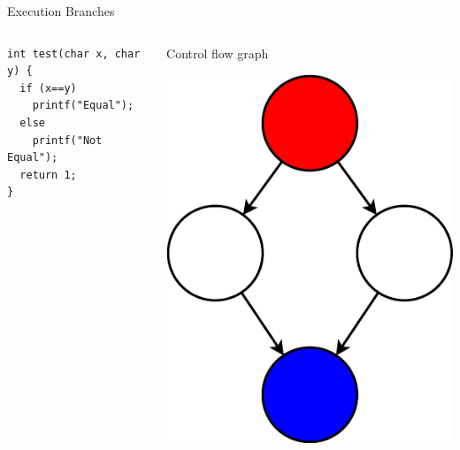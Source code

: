 \documentclass{beamer}
\begin{document}
\begin{frame}[fragile]{Execution Branches}
  \begin{columns}
    \begin{column}{0.5\textwidth}
      \begin{verbatim}
int test(char x, char y) {
  if (x==y)
    printf("Equal");
  else
    printf("Not Equal");
  return 1;
}
      \end{verbatim}
    \end{column}
    \begin{column}{0.5\textwidth}
      Control flow graph

      \includegraphics[height=0.6\textheight]{Control_flow_graph}
    \end{column}
  \end{columns}
\end{frame}
\end{document}
